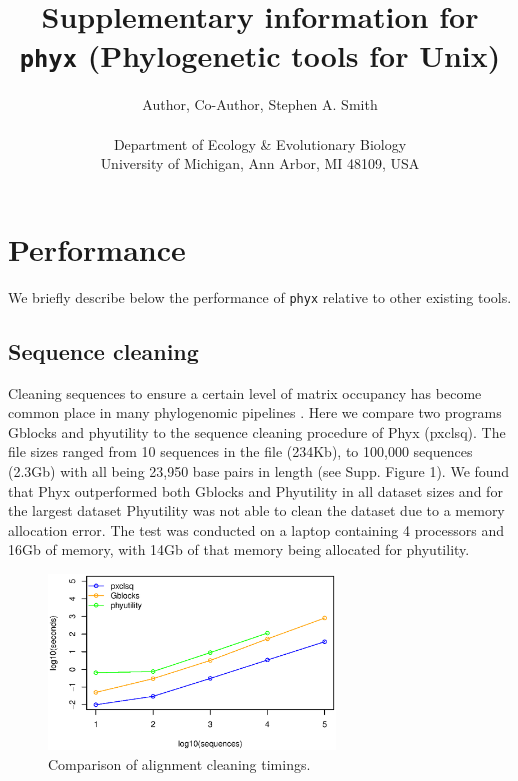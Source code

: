 \documentclass{article}
\begin{document}
\title{Supplementary information for \texttt{phyx} (Phylogenetic tools for Unix)}

\author{Author, Co-Author, Stephen A. Smith\\\\
\normalsize{Department of Ecology \& Evolutionary Biology}\\
\normalsize{University of Michigan, Ann Arbor, MI 48109, USA}}
\date{} %
\maketitle

\section{Performance}
We briefly describe below the performance of \texttt{phyx} relative to other
existing tools.

\subsection{Sequence cleaning}
Cleaning sequences to ensure a certain level of matrix occupancy has become common place in many phylogenomic pipelines \citep{Dunn2013,YangSmith2014}. Here we compare two programs Gblocks \citep{Gblocks} and phyutility \citep{SmithDunn2008} to the sequence cleaning procedure of Phyx (pxclsq). The file sizes ranged from 10 sequences in the file (234Kb), to 100,000 sequences (2.3Gb) with all being 23,950 base pairs in length (see Supp. Figure 1). 
We found that Phyx outperformed both Gblocks and Phyutility in all dataset sizes and for the largest dataset Phyutility was not able to clean the dataset due to a memory allocation error. The test was conducted on a laptop  containing 4 processors and 16Gb of memory, with 14Gb of that memory being allocated for phyutility.

\begin{figure}[H]
    \centering
    \includegraphics[width=3.0in]{clsq.eps}
    \caption{Comparison of alignment cleaning timings.}
    \label{cleaningfigure}
\label{fig:S1}
\end{figure}
\end{document}
